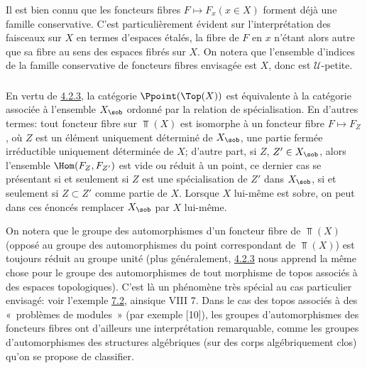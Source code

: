 \setcounter{subsubsection}{4}
\subsubsection{}
Il est bien connu que les foncteurs fibres $F\mapsto F_x(x\in X)$
forment déjà une famille conservative. C'est particulièrement
évident sur l'interprétation des faisceaux sur $X$ en termes
d'espaces étalés, la fibre de $F$ en $x$ n'étant alors autre que sa
fibre au sens des espaces fibrés sur $X$. On notera que l'ensemble
d'indices de la famille conservative de foncteurs fibres envisagée
est $X$, donc est $𝒰$-petite.

\subsubsection{}
En vertu de \hyperref[IV.subsubsec4.2.3]{4.2.3}, la catégorie $\Ppoint(\Top(X))$
est équivalente à la catégorie associée à l'ensemble $X_{\sob}$
ordonné par la relation de spécialisation. En d'autres termes: tout
foncteur fibre sur $\Top(X)$ est isomorphe à un foncteur fibre
$F\mapsto F_Z$, où $Z$ est un élément uniquement déterminé de
$X_{\sob}$, \ie une partie fermée irréductible uniquement
déterminée
de $X$; d'autre part, si $Z$, $Z'\in X_{\sob}$, alors l'ensemble
$\Hom(F_Z,F_{Z'})$ est vide ou réduit à un point, ce dernier cas se
présentant si et seulement si $Z$ est une spécialisation de $Z'$
dans $X_{\sob}$, \ie si et seulement si $Z\subset Z'$ comme partie
de $X$. Lorsque $X$ lui-même est sobre, on peut dans ces énoncés
remplacer $X_{\sob}$ par $X$ lui-même.

On notera que le groupe des automorphismes d'un foncteur fibre de
$\Top(X)$ (opposé au groupe des automorphismes du point
correspondant de $\Top(X)$) est toujours réduit au groupe unité
(plus généralement, \hyperref[IV.subsubsec4.2.3]{4.2.3} nous apprend la même
chose pour le groupe des automorphismes de tout morphisme de topos
associés à des espaces topologiques). C'est là un phénomène très
spécial au cas particulier envisagé: voir l'exemple
\hyperref[IV.subsec7.2]{7.2}, ainsi\pageoriginale que VIII 7. Dans le cas des
topos associés à des « problèmes de modules »  (\cf par exemple
[10]), les groupes d'automorphismes des foncteurs fibres ont
d'ailleurs une interprétation remarquable, comme les groupes
d'automorphismes des structures algébriques (sur des corps
algébriquement clos) qu'on se propose de classifier.


